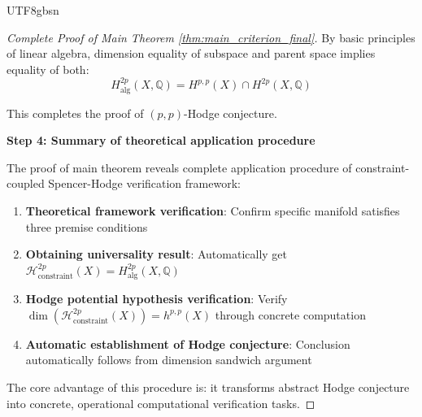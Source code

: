 \documentclass[a4paper,12pt]{extarticle}
\theoremstyle{definition}
\begin{document}
\begin{CJK}{UTF8}{gbsn}
\begin{proof}[Complete Proof of Main Theorem \ref{thm:main_criterion_final}]
By basic principles of linear algebra, dimension equality of subspace and parent space implies equality of both:
\begin{equation}
\label{eq:hodge_conjecture_final_conclusion}
H_{\text{alg}}^{2p}(X, \mathbb{Q}) = H^{p,p}(X) \cap H^{2p}(X, \mathbb{Q})
\end{equation}

This completes the proof of $(p,p)$-Hodge conjecture.

\textbf{Step 4: Summary of theoretical application procedure}

The proof of main theorem reveals complete application procedure of constraint-coupled Spencer-Hodge verification framework:

\begin{enumerate}
    \item \textbf{Theoretical framework verification}: Confirm specific manifold satisfies three premise conditions
    \item \textbf{Obtaining universality result}: Automatically get $\mathcal{H}_{\text{constraint}}^{2p}(X) = H_{\text{alg}}^{2p}(X, \mathbb{Q})$
    \item \textbf{Hodge potential hypothesis verification}: Verify $\dim(\mathcal{H}_{\text{constraint}}^{2p}(X)) = h^{p,p}(X)$ through concrete computation
    \item \textbf{Automatic establishment of Hodge conjecture}: Conclusion automatically follows from dimension sandwich argument
\end{enumerate}

The core advantage of this procedure is: it transforms abstract Hodge conjecture into concrete, operational computational verification tasks.
\end{proof}


\end{CJK}
\end{document}
